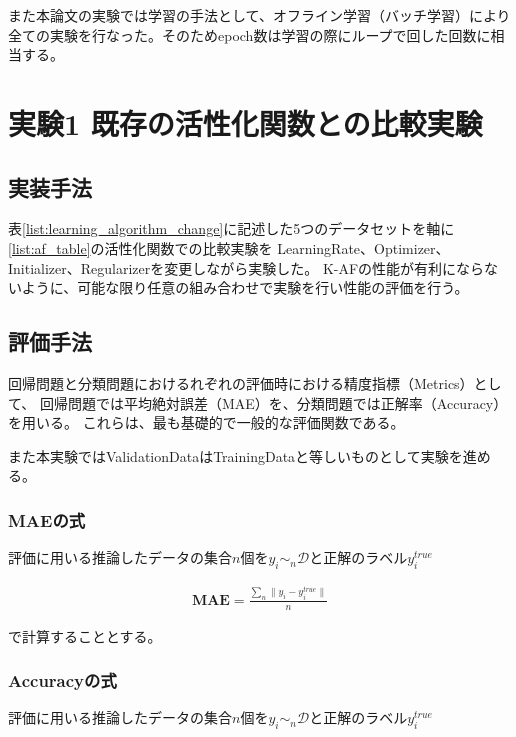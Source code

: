 また本論文の実験では学習の手法として、オフライン学習（バッチ学習）により全ての実験を行なった。そのためepoch数は学習の際にループで回した回数に相当する。



\section{実験1 既存の活性化関数との比較実験}
\label{exp1}
\subsection{実装手法}

表\ref{list:learning_algorithm_change}に記述した5つのデータセットを軸に\ref{list:af_table}の活性化関数での比較実験を
LearningRate、Optimizer、Initializer、Regularizerを変更しながら実験した。
K-AFの性能が有利にならないように、可能な限り任意の組み合わせで実験を行い性能の評価を行う。



\subsection{評価手法}

回帰問題と分類問題におけるれぞれの評価時における精度指標（Metrics）として、
回帰問題では平均絶対誤差（MAE）を、分類問題では正解率（Accuracy）を用いる。
これらは、最も基礎的で一般的な評価関数である。

また本実験ではValidationDataはTrainingDataと等しいものとして実験を進める。


\subsubsection{MAEの式}


評価に用いる推論したデータの集合$n$個を$ y_i \sim_n \mathcal{D}$と正解のラベル$ y_i^{true} $

\begin{eqnarray}
\mathbf{MAE} = \frac{\sum_n \|y_i - y_i^{true}\|}{n}
\label{eq:accuracy}
\end{eqnarray}

で計算することとする。


\subsubsection{Accuracyの式}

評価に用いる推論したデータの集合$n$個を$ y_i \sim_n \mathcal{D}$と正解のラベル$ y_i^{true} $

